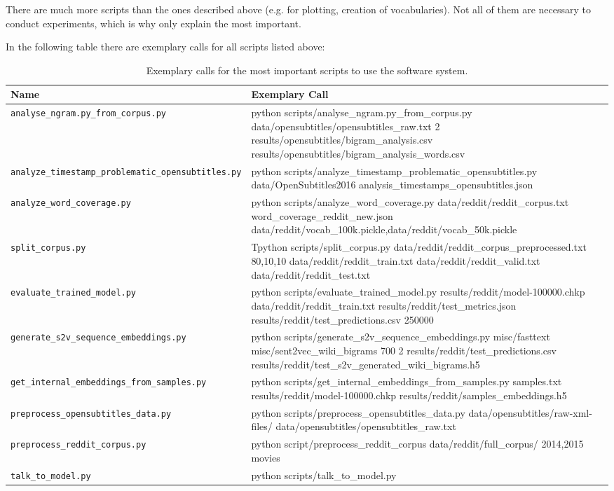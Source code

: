 There are much more scripts than the ones described above (e.g. for plotting, creation of vocabularies). Not all of them are necessary to conduct experiments, which is why only explain the most important.

In the following table there are exemplary calls for all scripts listed above:

\begin{table}[H]
	\centering
	\begin{adjustbox}{max width=\textwidth}
		\begin{tabular}{lp{20cm}}
			\toprule
			Name & Exemplary Call\\ \midrule
			\texttt{analyse{\_}ngram.py{\_}from{\_}corpus.py} & python scripts/analyse{\_}ngram.py{\_}from{\_}corpus.py data/opensubtitles/opensubtitles\_raw.txt 2 results/opensubtitles/bigram\_analysis.csv results/opensubtitles/bigram\_analysis\_words.csv\\
			\texttt{analyze{\_}timestamp{\_}problematic{\_}opensubtitles.py} & python scripts/analyze{\_}timestamp{\_}problematic{\_}opensubtitles.py data/OpenSubtitles2016 analysis\_timestamps\_opensubtitles.json\\
			\texttt{analyze{\_}word{\_}coverage.py} & python scripts/analyze{\_}word{\_}coverage.py data/reddit/reddit\_corpus.txt word\_coverage\_reddit\_new.json data/reddit/vocab\_100k.pickle,data/reddit/vocab\_50k.pickle\\
			\texttt{split{\_}corpus.py} & Tpython scripts/split{\_}corpus.py data/reddit/reddit\_corpus\_preprocessed.txt 80,10,10 data/reddit/reddit\_train.txt data/reddit/reddit\_valid.txt data/reddit/reddit\_test.txt\\
			\texttt{evaluate{\_}trained{\_}model.py} & python scripts/evaluate{\_}trained{\_}model.py results/reddit/model-100000.chkp data/reddit/reddit\_train.txt results/reddit/test\_metrics.json results/reddit/test\_predictions.csv 250000\\
			\texttt{generate{\_}s2v{\_}sequence{\_}embeddings.py} & python scripts/generate{\_}s2v{\_}sequence{\_}embeddings.py misc/fasttext misc/sent2vec\_wiki\_bigrams 700 2 results/reddit/test\_predictions.csv results/reddit/test\_s2v\_generated\_wiki\_bigrams.h5\\
			\texttt{get{\_}internal{\_}embeddings{\_}from{\_}samples.py} & python scripts/get{\_}internal{\_}embeddings{\_}from{\_}samples.py samples.txt results/reddit/model-100000.chkp results/reddit/samples\_embeddings.h5\\
			\texttt{preprocess{\_}opensubtitles{\_}data.py} & python scripts/preprocess\_opensubtitles\_data.py data/opensubtitles/raw-xml-files/ data/opensubtitles/opensubtitles\_raw.txt\\
			\texttt{preprocess{\_}reddit{\_}corpus.py} & python script/preprocess\_reddit\_corpus data/reddit/full\_corpus/ 2014,2015 movies\\
			\texttt{talk{\_}to{\_}model.py} & python scripts/talk\_to\_model.py\\
			\bottomrule
		\end{tabular}
	\end{adjustbox}
	\caption{Exemplary calls for the most important scripts to use the software system.}
\end{table}

